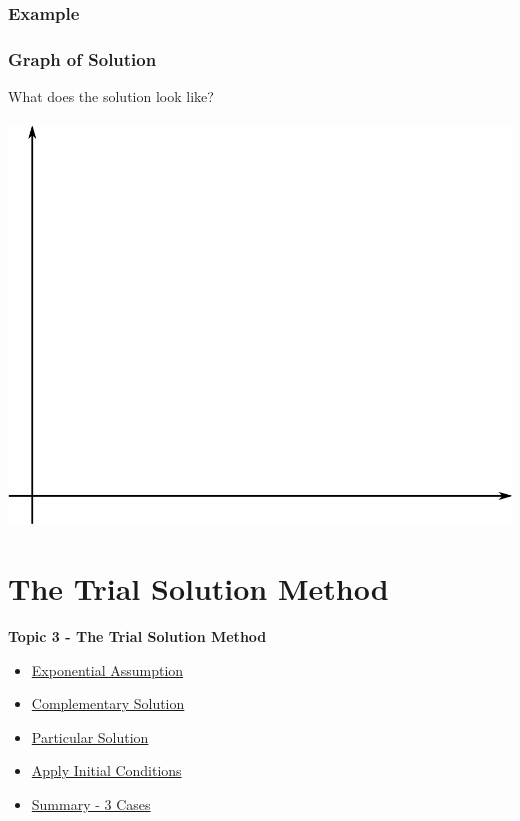 \documentclass[fleqn]{beamer} %
\newcommand{\sectionIIItitle}{The Trial Solution Method}
\newcommand{\sectionIIsubsectionIIItitle}{Example}
\newcommand{\sectionIIIsubsectionItitle}{Exponential Assumption}
\newcommand{\sectionIIIsubsectionIItitle}{Complementary Solution}
\newcommand{\sectionIIIsubsectionIIItitle}{Particular Solution}
\newcommand{\sectionIIIsubsectionIVtitle}{Apply Initial Conditions}
\newcommand{\sectionIIIsubsectionVtitle}{Summary - 3 Cases}
\begin{document}
			\begin{frame}
				\frametitle{\sectionIIsubsectionIIItitle}
				\bigskip

				\frametitle{Graph of Solution}

				What does the solution look like?\vspace{5mm}\\
				 \vspace{5mm}\\

				\includegraphics[scale=0.15]{images/lecture1_fig2.png}\hspace{5mm}%
				

				\btVFill 
			\end{frame}


		
	\section{\sectionIIItitle}\label{sectionIII}

		\begin{frame}
			\large \textbf{Topic 3 - \sectionIIItitle} \vspace{3mm}\\

			\begin{itemize}
				\item \hyperlink{sectionIIIsubsectionI}{\sectionIIIsubsectionItitle} \vspc %
				\item \hyperlink{sectionIIIsubsectionII}{\sectionIIIsubsectionIItitle} \vspc %
				\item \hyperlink{sectionIIIsubsectionIII}{\sectionIIIsubsectionIIItitle} \vspc %
				\item \hyperlink{sectionIIIsubsectionIV}{\sectionIIIsubsectionIVtitle} \vspc %
				\item \hyperlink{sectionIIIsubsectionV}{\sectionIIIsubsectionVtitle} \vspc %
			\end{itemize}

		\end{frame}
\end{document}
